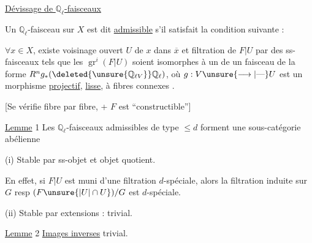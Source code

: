 
\uline{Dévissage de $\mathbb Q_\ell$-faisceaux}


Un $\mathbb Q_\ell$-faisceau   sur $X$ est dit \uline{admissible}  s'il satisfait la condition suivante :

$\forall x\in X$, existe voisinage ouvert $U$ de $x$ dans $\overline{x}$ et filtration  de $F|U$ par des ss-faisceaux  tels que les $\operatorname{gr}^i(F|U)$ soient isomorphes à un   de un faisceau de la forme $R^n g_*(\deleted{\unsure{\mathbb Q_{\ell V}}}\mathbb Q_\ell)$, où $g:V\unsure{\longrightarrow|\text{---}}U$ est un morphisme \uline{projectif},  \uline{lisse}, à fibres connexes .


[Se vérifie fibre par fibre, + $F$ est ``constructible'']

 

\uline{Lemme} 1 \quad Les  $\mathbb Q_\ell$-faisceaux admissibles de type $\leq d$ forment une sous-catégorie abélienne   

 (i) Stable par ss-objet et objet quotient.

En effet, si $F|U$ est muni d'une filtration $d$-spéciale,  alors la filtration induite sur $G$ resp $(F\unsure{\vert U|\cap U})/G$ est $d$-spéciale. 

(ii) Stable par extensions : trivial.

\uline{Lemme} 2 \quad \uline{Images inverses} \qquad trivial.

